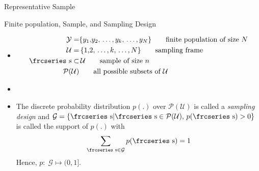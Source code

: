 \documentclass[10pt]{beamer}\usepackage[]{graphicx}\usepackage[]{color}
\newcommand{\eqname}[1]{\tag*{#1}} %
\newcommand{\textfrc}[1]{{\frcseries#1}}
\newcommand{\mathfrc}[1]{\text{\textfrc{#1}}}
\begin{document}
\begin{frame}{Representative Sample}


\end{frame}

\begin{frame}{Finite population, Sample, and Sampling Design}

 \begin{itemize}
 \item[] 
 \begin{align}
 \mathcal{Y} = & \{ y_1{,}y_2{,}\,\ldots{,}\,y_k{,}\,\ldots{,}\,y_N \} \eqname{finite population of size $N$} \\
 \mathcal{U} = &\, \{ 1{,}2{,}\,\ldots{,}\,k{,}\,\ldots{,}\,N \} \eqname{sampling frame} \\
 \mathfrc{s} \subset &\, \mathcal{U} \eqname{sample of size $n$} \\
 \mathcal{P}(\mathcal{U}) & \eqname{all possible subsets of $\mathcal{U}$}
 \end{align}
 \item[]
\item[]
The discrete probability distribution $p(.)$ over $\mathcal{P}(\mathcal{U})$ is called
a \emph{sampling design} and  $\mathcal{G}=\{ \mathfrc{s} | \mathfrc{s} \in
\mathcal{P}(\mathcal{U}),\, p(\mathfrc{s}) > 0 \}$ is called the support of $p(.)$ with
$$
\sum_{\mathfrc{s} \in \mathcal{G}} p(\mathfrc{s}) = 1
$$
Hence, $p: \; \mathcal{G} \mapsto (0, 1]$.
 \end{itemize}
\end{frame}
\end{document}
